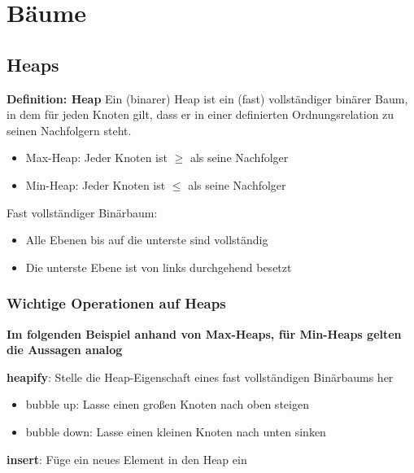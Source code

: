 \documentclass[12pt]{article}
\begin{document}
\section{Bäume}





\subsection{Heaps}

\textbf{Definition: Heap}
Ein (binarer) Heap ist ein (fast) vollständiger binärer Baum, in dem für jeden Knoten gilt, dass er in einer definierten Ordnungsrelation zu seinen Nachfolgern steht.
\begin{itemize}
	\item Max-Heap: Jeder Knoten ist $ \geq $ als seine Nachfolger
	\item Min-Heap: Jeder Knoten ist $ \leq $ als seine Nachfolger
\end{itemize}

Fast vollständiger Binärbaum:
\begin{itemize}
	\item Alle Ebenen bis auf die unterste sind vollständig
	\item Die unterste Ebene ist von links durchgehend besetzt
\end{itemize}

\subsubsection{Wichtige Operationen auf Heaps}

\textbf{Im folgenden Beispiel anhand von Max-Heaps, für Min-Heaps gelten die Aussagen analog}
\newline

\textbf{heapify}: Stelle die Heap-Eigenschaft eines fast vollständigen Binärbaums her 
\begin{itemize}
	\item bubble up: Lasse einen großen Knoten nach oben steigen
	\item bubble down: Lasse einen kleinen Knoten nach unten sinken
\end{itemize}
\textbf{insert}: Füge ein neues Element in den Heap ein \newline
\newline




\end{document}
